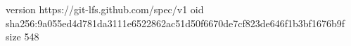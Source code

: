 version https://git-lfs.github.com/spec/v1
oid sha256:9a055ed4d781da3111e6522862ac51d50f6670de7cf823de646f1b3bf1676b9f
size 548
